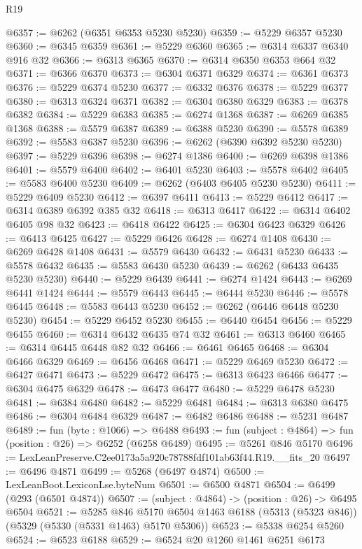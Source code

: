 \begin{lexlean}{R19}
\begin{coremodule}
@6357 := @6262 (@6351 @6353 @5230 @5230)
@6359 := @5229 @6357 @5230
@6360 := @6345 @6359
@6361 := @5229 @6360
@6365 := @6314 @6337 @6340 @916 @32
@6366 := @6313 @6365
@6370 := @6314 @6350 @6353 @664 @32
@6371 := @6366 @6370
@6373 := @6304 @6371 @6329
@6374 := @6361 @6373
@6376 := @5229 @6374 @5230
@6377 := @6332 @6376
@6378 := @5229 @6377
@6380 := @6313 @6324 @6371
@6382 := @6304 @6380 @6329
@6383 := @6378 @6382
@6384 := @5229 @6383
@6385 := @6274 @1368
@6387 := @6269 @6385 @1368
@6388 := @5579 @6387
@6389 := @6388 @5230
@6390 := @5578 @6389
@6392 := @5583 @6387 @5230
@6396 := @6262 (@6390 @6392 @5230 @5230)
@6397 := @5229 @6396
@6398 := @6274 @1386
@6400 := @6269 @6398 @1386
@6401 := @5579 @6400
@6402 := @6401 @5230
@6403 := @5578 @6402
@6405 := @5583 @6400 @5230
@6409 := @6262 (@6403 @6405 @5230 @5230)
@6411 := @5229 @6409 @5230
@6412 := @6397 @6411
@6413 := @5229 @6412
@6417 := @6314 @6389 @6392 @385 @32
@6418 := @6313 @6417
@6422 := @6314 @6402 @6405 @98 @32
@6423 := @6418 @6422
@6425 := @6304 @6423 @6329
@6426 := @6413 @6425
@6427 := @5229 @6426
@6428 := @6274 @1408
@6430 := @6269 @6428 @1408
@6431 := @5579 @6430
@6432 := @6431 @5230
@6433 := @5578 @6432
@6435 := @5583 @6430 @5230
@6439 := @6262 (@6433 @6435 @5230 @5230)
@6440 := @5229 @6439
@6441 := @6274 @1424
@6443 := @6269 @6441 @1424
@6444 := @5579 @6443
@6445 := @6444 @5230
@6446 := @5578 @6445
@6448 := @5583 @6443 @5230
@6452 := @6262 (@6446 @6448 @5230 @5230)
@6454 := @5229 @6452 @5230
@6455 := @6440 @6454
@6456 := @5229 @6455
@6460 := @6314 @6432 @6435 @74 @32
@6461 := @6313 @6460
@6465 := @6314 @6445 @6448 @82 @32
@6466 := @6461 @6465
@6468 := @6304 @6466 @6329
@6469 := @6456 @6468
@6471 := @5229 @6469 @5230
@6472 := @6427 @6471
@6473 := @5229 @6472
@6475 := @6313 @6423 @6466
@6477 := @6304 @6475 @6329
@6478 := @6473 @6477
@6480 := @5229 @6478 @5230
@6481 := @6384 @6480
@6482 := @5229 @6481
@6484 := @6313 @6380 @6475
@6486 := @6304 @6484 @6329
@6487 := @6482 @6486
@6488 := @5231 @6487
@6489 := fun (byte : @1066) => @6488
@6493 := fun (subject : @4864) => fun (position : @26) => @6252 (@6258 @6489)
@6495 := @5261 @846 @5170
@6496 := LexLeanPreserve.C2ee0173a5a920c78788fdf101ab63f44.R19.__fits_20
@6497 := @6496 @4871
@6499 := @5268 (@6497 @4874)
@6500 := LexLeanBoot.LexiconLse.byteNum
@6501 := @6500 @4871
@6504 := @6499 (@293 (@6501 @4874))
@6507 := (subject : @4864) -> (position : @26) -> @6495 @6504
@6521 := @5285
    @846
    @5170
    @6504
    @1463
    @6188
    (@5313 (@5323 @846))
    (@5329 (@5330 (@5331 @1463) @5170 @5306))
@6523 := @5338 @6254 @5260
@6524 := @6523 @6188
@6529 := @6524 @20 @1260 @1461 @6251 @6173

\end{coremodule}
\end{lexlean}
